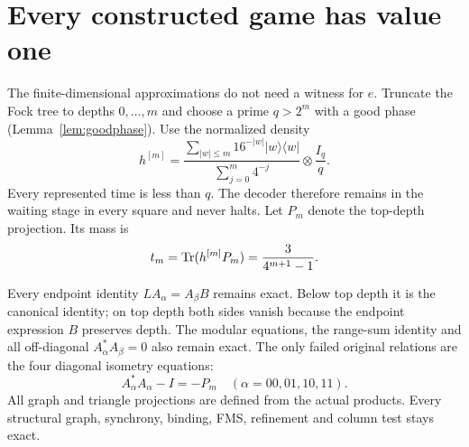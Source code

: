 \section[Value one for every constructed game]{Every constructed game has value one}\label{sec:value}
The finite-dimensional approximations do not need a witness for $e$. Truncate the Fock tree to depths $0,\ldots,m$ and choose a prime $q>2^m$ with a good phase (Lemma~\ref{lem:goodphase}). Use the normalized density
\[
 h^{[m]}=\frac{\sum_{|w|\leq m}16^{-|w|}|w\rangle\langle w|}
 {\sum_{j=0}^m4^{-j}}\otimes\frac{I_q}{q}.
\]
Every represented time is less than $q$. The decoder therefore remains in the waiting stage in every square and never halts. Let $P_m$ denote the top-depth projection. Its mass is
\begin{equation}\label{eq:topmass}
 t_m=\operatorname{Tr}(h^{[m]}P_m)=\frac{3}{4^{m+1}-1}.
\end{equation}

Every endpoint identity $LA_\alpha=A_\beta B$ remains exact. Below top depth it is the canonical identity; on top depth both sides vanish because the endpoint expression $B$ preserves depth. The modular equations, the range-sum identity and all off-diagonal $A_\alpha^*A_\beta=0$ also remain exact. The only failed original relations are the four diagonal isometry equations:
\begin{equation}\label{eq:fourdefects}
 A_\alpha^*A_\alpha-I=-P_m\quad(\alpha=00,01,10,11).
\end{equation}
All graph and triangle projections are defined from the actual products. Every structural graph, synchrony, binding, FMS, refinement and column test stays exact.

